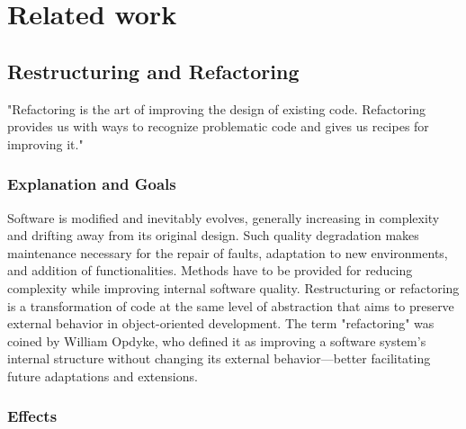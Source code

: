 
%

\chapter{Related work}
\label{cha:Related work}
  

\cite{wake2004refactoring}
\cite{estructuringArnold1989}
\cite{articleOpdyke}
\cite{RefactoringFowler2002}
\cite{SurveyRefactoring2004}
\cite{smellsRefactoring2020}
\cite{30yearsSoftwareRefactoring2020}
\cite{ManagingMaintenance1983}

\section{Restructuring and Refactoring}

"Refactoring is the art of improving the design of existing code. Refactoring provides us with ways to recognize problematic code and gives us recipes for improving it."

\subsection{Explanation and Goals}

Software is modified and inevitably evolves, generally increasing in complexity and drifting away from its original design. Such quality degradation makes maintenance necessary for the repair of faults, adaptation to new environments, and addition of functionalities. Methods have to be provided for reducing complexity while improving internal software quality. Restructuring or refactoring is a transformation of code at the same level of abstraction that aims to preserve external behavior in object-oriented development.
The term "refactoring" was coined by William Opdyke, who defined it as improving a software system's internal structure without changing its external behavior—better facilitating future adaptations and extensions.

\subsection{Effects}


